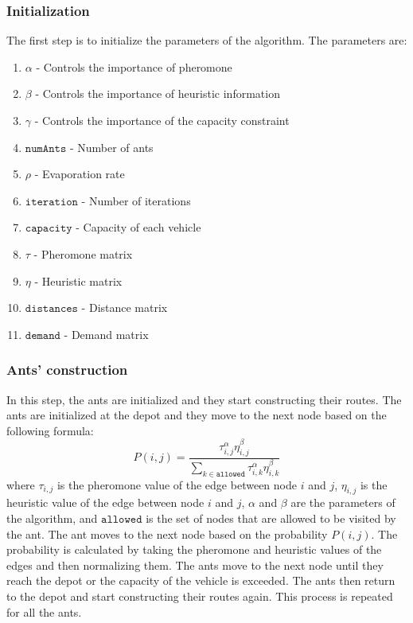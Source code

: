 \documentclass{article}
\begin{document}
\subsubsection{Initialization}
The first step is to initialize the parameters of the algorithm. The parameters are:
\begin{enumerate}
  \item $\alpha$ - Controls the importance of pheromone
  \item $\beta$ - Controls the importance of heuristic information
  \item $\gamma$ - Controls the importance of the capacity constraint
  \item $\texttt{numAnts}$ - Number of ants
  \item $\rho$ - Evaporation rate
  \item $\texttt{iteration}$ - Number of iterations
  \item $\texttt{capacity}$ - Capacity of each vehicle
  \item $\tau$ - Pheromone matrix
  \item $\eta$ - Heuristic matrix
  \item $\texttt{distances}$ - Distance matrix
  \item $\texttt{demand}$ - Demand matrix
\end{enumerate}

\subsubsection{Ants' construction}
In this step, the ants are initialized and they start constructing their routes. The ants are initialized at the depot and they move to the next node based on the following formula:
\begin{equation}
  P(i,j) = \frac{\tau_{i,j}^\alpha \eta_{i,j}^\beta}{\sum_{k \in \texttt{allowed}} \tau_{i,k}^\alpha \eta_{i,k}^\beta}
\end{equation}
where $\tau_{i,j}$ is the pheromone value of the edge between node $i$ and $j$, $\eta_{i,j}$ is the heuristic value of the edge between node $i$ and $j$, $\alpha$ and $\beta$ are the parameters of the algorithm, and $\texttt{allowed}$ is the set of nodes that are allowed to be visited by the ant. The ant moves to the next node based on the probability $P(i,j)$. The probability is calculated by taking the pheromone and heuristic values of the edges and then normalizing them. The ants move to the next node until they reach the depot or the capacity of the vehicle is exceeded. The ants then return to the depot and start constructing their routes again. This process is repeated for all the ants.
\end{document}
